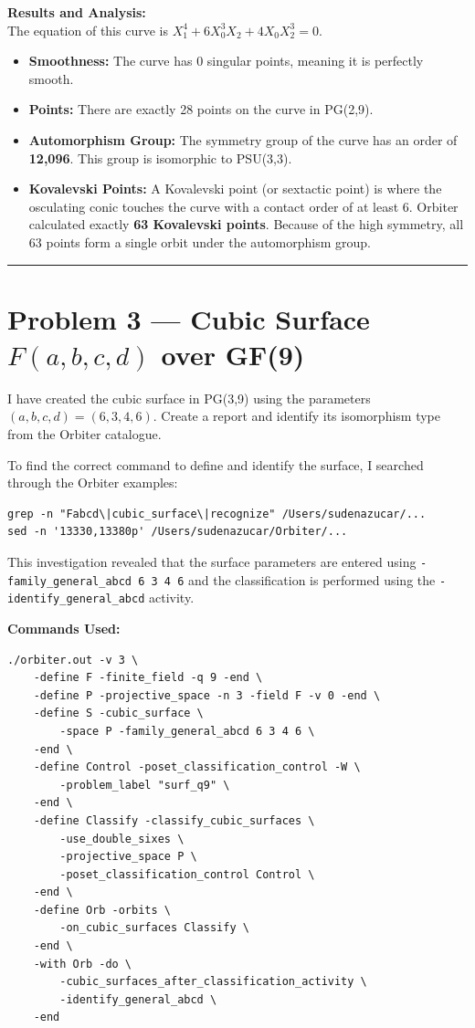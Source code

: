 \documentclass[12pt,a4paper]{article}
\begin{document}
\textbf{Results and Analysis:}\\
The equation of this curve is $X_1^4 + 6X_0^3X_2 + 4X_0X_2^3 = 0$.
\begin{itemize}
    \item \textbf{Smoothness:} The curve has 0 singular points, meaning it is perfectly smooth.
    \item \textbf{Points:} There are exactly 28 points on the curve in PG(2,9).
    \item \textbf{Automorphism Group:} The symmetry group of the curve has an order of \textbf{12,096}. This group is isomorphic to PSU(3,3).
    \item \textbf{Kovalevski Points:} A Kovalevski point (or sextactic point) is where the osculating conic touches the curve with a contact order of at least 6. Orbiter calculated exactly \textbf{63 Kovalevski points}. Because of the high symmetry, all 63 points form a single orbit under the automorphism group.
\end{itemize}

\vspace{0.5cm}
\hrule
\vspace{0.5cm}

\section*{Problem 3 --- Cubic Surface $F(a,b,c,d)$ over GF(9)}

I have created the cubic surface in PG(3,9) using the parameters $(a, b, c, d) = (6, 3, 4, 6)$. Create a report and identify its isomorphism type from the Orbiter catalogue.

To find the correct command to define and identify the surface, I searched through the Orbiter examples:
\begin{verbatim}
grep -n "Fabcd\|cubic_surface\|recognize" /Users/sudenazucar/...
sed -n '13330,13380p' /Users/sudenazucar/Orbiter/...
\end{verbatim}
This investigation revealed that the surface parameters are entered using \texttt{-family\_general\_abcd 6 3 4 6} and the classification is performed using the \texttt{-identify\_general\_abcd} activity.

\vspace{0.3cm}\noindent\textbf{Commands Used:}
\begin{verbatim}
./orbiter.out -v 3 \
    -define F -finite_field -q 9 -end \
    -define P -projective_space -n 3 -field F -v 0 -end \
    -define S -cubic_surface \
        -space P -family_general_abcd 6 3 4 6 \
    -end \
    -define Control -poset_classification_control -W \
        -problem_label "surf_q9" \
    -end \
    -define Classify -classify_cubic_surfaces \
        -use_double_sixes \
        -projective_space P \
        -poset_classification_control Control \
    -end \
    -define Orb -orbits \
        -on_cubic_surfaces Classify \
    -end \
    -with Orb -do \
        -cubic_surfaces_after_classification_activity \
        -identify_general_abcd \
    -end
\end{verbatim}
\end{document}
